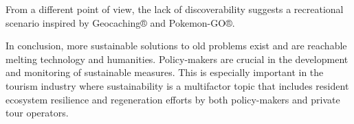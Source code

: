 \documentclass[sustainability,article,submit,pdftex,moreauthors]{Definitions/mdpi}
\begin{document}
From a different point of view, the lack of discoverability suggests a recreational scenario inspired by Geocaching® and Pokemon-GO®.

In conclusion, more sustainable solutions to old problems exist and are reachable melting technology and humanities. Policy-makers are crucial in the development and monitoring of sustainable measures. This is especially important in the tourism industry where sustainability is a multifactor topic that includes resident ecosystem resilience and regeneration efforts by both policy-makers and private tour operators.



\end{document}
